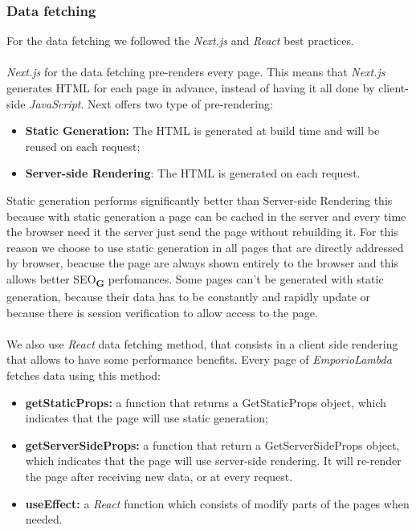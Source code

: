 \subsubsection{Data fetching}
For the data fetching we followed the \textit{Next.js} and \textit{React} best practices.
\\
\\
\textit{Next.js} for the data fetching pre-renders every page. This means that \textit{Next.js} generates HTML for each page in advance, instead of having it all done by client-side \textit{JavaScript}. Next offers two type of pre-rendering:
\begin{itemize}
  \item \textbf{Static Generation:} The HTML is generated at build time and will be reused on each request;
  \item \textbf{Server-side Rendering}: The HTML is generated on each request.
\end{itemize}
Static generation performs significantly better than Server-side Rendering this because with static generation a page can be cached in the server and every time the browser need it the server just send the page without rebuilding it. For this reason we choose to use static generation in all pages that are directly addressed by browser, beacuse the page are always shown entirely to the browser and this allows better SEO\textsubscript{\textbf{G}} perfomances. Some pages can't be generated with static generation, because their data has to be constantly and rapidly update or because there is session verification to allow access to the page.
\\
\\
We also use \textit{React} data fetching method, that consists in a client side rendering that allows to have some performance benefits.
Every page of \textit{EmporioLambda} fetches data using this method:
\begin{itemize}
  \item \textbf{getStaticProps:} a function that returns a GetStaticProps object, which indicates that the page will use static generation;
  \item \textbf{getServerSideProps:} a function that return a GetServerSideProps object, which indicates that the page will use server-side rendering. It will  re-render the page after receiving new data, or at every request.
  \item \textbf{useEffect:} a \textit{React} function which consists of modify parts of the pages when needed.
\end{itemize}

